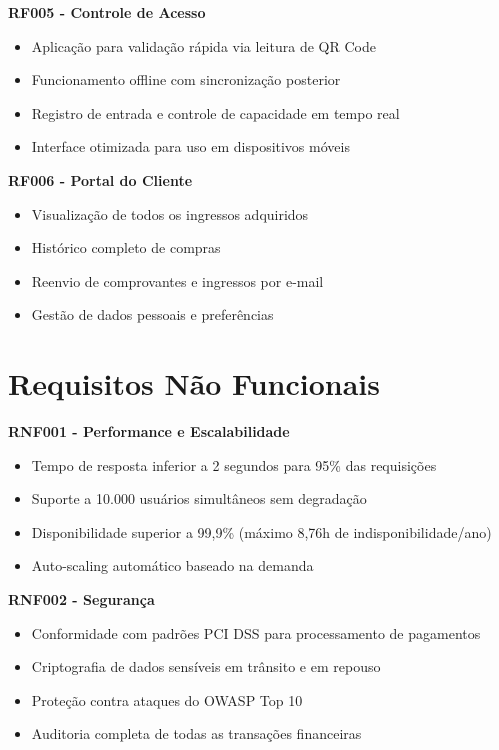 \textbf{RF005 - Controle de Acesso}
\begin{itemize}
    \item Aplicação para validação rápida via leitura de QR Code
    \item Funcionamento offline com sincronização posterior
    \item Registro de entrada e controle de capacidade em tempo real
    \item Interface otimizada para uso em dispositivos móveis
\end{itemize}

\textbf{RF006 - Portal do Cliente}
\begin{itemize}
    \item Visualização de todos os ingressos adquiridos
    \item Histórico completo de compras
    \item Reenvio de comprovantes e ingressos por e-mail
    \item Gestão de dados pessoais e preferências
\end{itemize}

\section{Requisitos Não Funcionais}

\textbf{RNF001 - Performance e Escalabilidade}
\begin{itemize}
    \item Tempo de resposta inferior a 2 segundos para 95\% das requisições
    \item Suporte a 10.000 usuários simultâneos sem degradação
    \item Disponibilidade superior a 99,9\% (máximo 8,76h de indisponibilidade/ano)
    \item Auto-scaling automático baseado na demanda
\end{itemize}

\textbf{RNF002 - Segurança}
\begin{itemize}
    \item Conformidade com padrões PCI DSS para processamento de pagamentos~\cite{PCIDSS:2022}
    \item Criptografia de dados sensíveis em trânsito e em repouso
    \item Proteção contra ataques do OWASP Top 10~\cite{OWASP:2021}
    \item Auditoria completa de todas as transações financeiras
\end{itemize}

